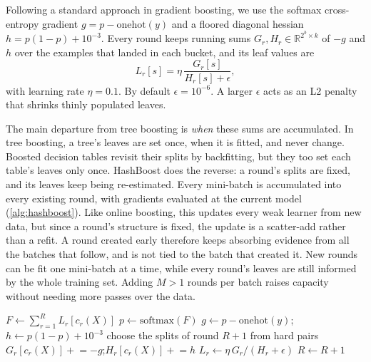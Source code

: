 \documentclass[a4paper, 11pt]{article}
\begin{document}
Following a standard approach in gradient boosting, we use the softmax
cross-entropy gradient $g = p - \mathrm{onehot}(y)$ and a floored diagonal
hessian $h = p(1-p) + 10^{-3}$. Every round keeps running sums
$G_r, H_r \in \mathbb{R}^{2^b \times k}$ of $-g$ and $h$ over the examples that
landed in each bucket, and its leaf values are
\begin{equation}
    L_r[s] = \eta \, \frac{G_r[s]}{H_r[s] + \epsilon},
\end{equation}
with learning rate $\eta = 0.1$. By default $\epsilon = 10^{-6}$. A larger
$\epsilon$ acts as an L2 penalty that shrinks thinly populated leaves.

The main departure from tree boosting is \emph{when} these sums are
accumulated. In tree boosting, a tree's leaves are set once, when it is
fitted, and never change. Boosted decision tables revisit their splits by
backfitting, but they too set each table's leaves only once. HashBoost does
the reverse: a round's splits are fixed, and its leaves keep being
re-estimated. Every mini-batch is accumulated into every existing round,
with gradients evaluated at the current model (\cref{alg:hashboost}). Like
online boosting, this updates every weak learner from new data, but since a
round's structure is fixed, the update is a scatter-add rather than a refit.
A round created early therefore keeps absorbing evidence from all the
batches that follow, and is not tied to the batch that created it. New
rounds can be fit one mini-batch at a time, while every round's leaves are
still informed by the whole training set. Adding $M > 1$ rounds per batch raises capacity
without needing more passes over the data.

\begin{algorithm}[t]
    \caption{One HashBoost step on a mini-batch $(X, y)$ of $n$ examples,
        adding $M$ rounds.}
    \label{alg:hashboost}
    \begin{algorithmic}[1]
        \State $F \gets \sum_{r=1}^{R} L_r[c_r(X)]$ 
        \State $p \gets \mathrm{softmax}(F)$ 
        \State $g \gets p - \mathrm{onehot}(y)$;\quad $h \gets p(1-p) + 10^{-3}$ 
        \State choose the splits of round $R+1$ from hard pairs 
         
        \State $G_r[c_r(X)] \mathrel{+}= -g$;\quad $H_r[c_r(X)] \mathrel{+}= h$ 
        \State $L_r \gets \eta\, G_r / (H_r + \epsilon)$ 
        \EndFor
        \State $R \gets R + 1$
        \EndFor
    \end{algorithmic}
\end{algorithm}
\end{document}
